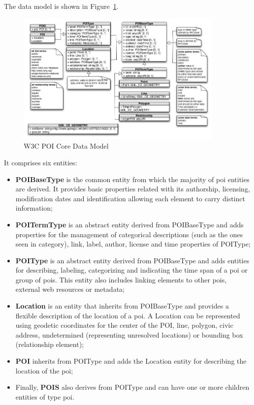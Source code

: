 \documentclass[times,doublespace]{ettauth}%
\begin{document}
The data model is shown in Figure~\ref{fig:data-model}.
\begin{figure}
\centering
\includegraphics[width=0.9\textwidth]{images/uml}
\caption{W3C POI Core Data Model~\cite{w3c-poi}}
\label{fig:data-model}
\end{figure}
It comprises six entities:
\begin{itemize}
\item \textbf{POIBaseType} is the common entity from which the majority of \ac{poi} entities are derived.
It provides basic properties related with its authorship, licensing, modification dates and identification allowing each element to carry distinct information;
\item \textbf{POITermType} is an abstract entity derived from POIBaseType and adds properties for the management of categorical descriptions (such as the ones seen in category), link, label, author, license and time properties of POIType;
\item \textbf{POIType} is an abstract entity derived from POIBaseType and adds entities for describing, labeling, categorizing and indicating the time span of a \ac{poi} or group of \acp{poi}.
This entity also includes linking elements to other \acp{poi}, external web resources or metadata;
\item \textbf{Location} is an entity that inherits from POIBaseType and provides a flexible description of the location of a \ac{poi}.
A Location can be represented using geodetic coordinates for the center of the POI, line, polygon, civic address, undetermined (representing unresolved locations) or bounding box (relationship element);
\item \textbf{POI} inherits from POIType and adds the Location entity for describing the location of the \ac{poi};
\item Finally, \textbf{POIS} also derives from POIType and can have one or more children entities of type \ac{poi}.
\end{itemize}
\end{document}
